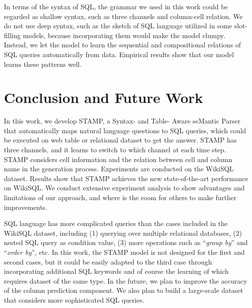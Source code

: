 \documentclass[11pt,a4paper]{article}
\begin{document}
In terms of the syntax of SQL, the grammar we used in this work could be regarded as shallow syntax, such as three channels and column-cell relation. We do not use deep syntax, such as the sketch of SQL language utilized in some slot-filling models, because incorporating them would make the model clumpy. Instead, we let the model to learn the sequential and compositional relations of SQL queries automatically from data. Empirical results show that our model learns these patterns well.


\section{Conclusion and Future Work}
In this work, we develop STAMP, a Syntax- and Table- Aware seMantic Parser that automatically maps natural language questions to SQL queries, which could be executed on web table or relational dataset to get the answer.
STAMP has three channels, and it \mbox{learns} to switch to which channel at each time step.
\mbox{STAMP} considers cell information and the relation between cell and column name in the generation process.
Experiments are conducted on the WikiSQL dataset. Results show that STAMP achieves the new state-of-the-art performance on WikiSQL.
We conduct extensive experiment analysis to show
advantages and limitations of our approach, and where is the room for others to make further improvements.

SQL language has more complicated queries than the cases included in the WikiSQL dataset, including (1) querying over multiple relational databases, (2) nested SQL query as condition value, (3) more operations such as ``\textit{group by}'' and ``\textit{order by}'', etc.
In this work, the STAMP model is not designed for the first and second cases, but it could be easily adapted to the third case through incorporating additional SQL keywords and of course the learning of which requires dataset of the same type.
In the future, we plan to improve the accuracy of the column prediction \mbox{component}.
We also plan to build a large-scale dataset that considers more sophisticated SQL queries.




\appendix



	
\end{document}
